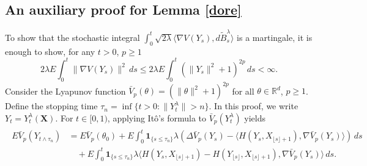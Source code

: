 \documentclass[a4paper]{article}
\begin{document}
\subsection{An auxiliary proof for Lemma \ref{dore}}\label{sec_martingale}
To show that the stochastic integral $\int_0^t\sqrt{2\lambda} \langle \nabla V(Y_s), d \tilde{B}^{\lambda}_s \rangle$ is a martingale, it is enough to show, for any $t >0$, $p \geq 1$
\[
2\lambda E\int_0^t\| \nabla V(Y_s)\|^2\, ds \leq 2\lambda E\int_0^t(\| Y_s\|^2+1)^{2p}\, ds  <\infty.
\]Consider the Lyapunov function $\bar{V}_p(\theta) = (\|\theta\|^2+1)^{2p}$ for all $\theta \in \mathbb{R}^d$, $p \geq 1$. %
Define the stopping time $\tau_n = \inf\{t>0: \|Y^{\lambda}_t\| >n\}$. In this proof, we write $Y_t = Y^{\lambda}_t(\mathbf{X}) $. For $t \in [0,1)$, applying It\^o's formula to $ \bar{V}_p(Y^{\lambda}_t)$ yields
\begin{align}
\begin{split}\label{esapp1}
E\bar{V}_p(Y_{t\wedge \tau_n}) &=E\bar{V}_p(\theta_0) + E \int_0^t \mathbf{1}_{\{s \leq \tau_n\}}\lambda \left(\Delta \bar{V}_p(Y_s)- \langle H(Y_s, X_{\lfloor s \rfloor+1}), \nabla \bar{V}_p(Y_s)\rangle \right) \,ds \\
&\hspace{1em} +E \int_0^t \mathbf{1}_{\{s \leq \tau_n\}} \lambda \langle H(Y_s,  X_{\lfloor s \rfloor+1}) - H(Y_ {\lfloor s \rfloor}, X_{\lfloor s \rfloor+1}), \nabla \bar{V}_p(Y_s)\rangle \,ds.
\end{split}
\end{align}
\end{document}
